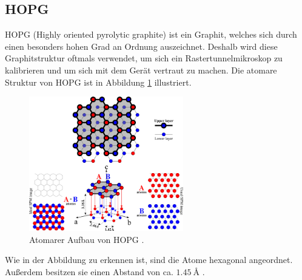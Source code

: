 \subsection{HOPG}
HOPG (Highly oriented pyrolytic graphite) ist ein Graphit, welches sich durch einen besonders hohen Grad
an Ordnung auszeichnet. Deshalb wird diese Graphitstruktur oftmals verwendet, um sich ein Rastertunnelmikroskop zu kalibrieren und
um sich mit dem Gerät vertraut zu machen. %
Die atomare Struktur von HOPG %
ist in Abbildung \ref{fig: hopg} illustriert.
\begin{figure}[!h]
  \centering
  \includegraphics[width=0.6\textwidth]{./pics/hopg.jpg}
  \caption{Atomarer Aufbau von HOPG \cite{hopg}.}
  \label{fig: hopg}
\end{figure}
Wie in der Abbildung zu erkennen ist, sind die Atome hexagonal angeordnet. Außerdem besitzen sie einen Abstand von ca.
$\SI{1.45}{\angstrom}$ \cite{hopg}. %
